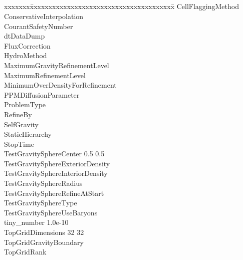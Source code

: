 \documentclass{book}
\begin{document}
\subsection{\enzo}

{\parametersize
\begin{tabbing}
xxxxxxx\=xxxxxxxxxxxxxxxxxxxxxxxxxxxxxxxxxxxxxxx\=\kill
\> CellFlaggingMethod               \\
\> ConservativeInterpolation        \\
\> CourantSafetyNumber          \\
\> dtDataDump              \\
\> FluxCorrection                   \\
\> HydroMethod             \\
\> MaximumGravityRefinementLevel    \\
\> MaximumRefinementLevel               \\
\> MinimumOverDensityForRefinement  \\
\> PPMDiffusionParameter          \\
\> ProblemType                   \\
\> RefineBy                             \\
\> SelfGravity                    \\
\> StaticHierarchy                      \\
\> StopTime                \\
\> TestGravitySphereCenter             0.5 0.5 \\
\> TestGravitySphereExteriorDensity    \\
\> TestGravitySphereInteriorDensity    \\
\> TestGravitySphereRadius             \\
\> TestGravitySphereRefineAtStart      \\
\> TestGravitySphereType               \\
\> TestGravitySphereUseBaryons         \\
\> tiny\_number            \> 1.0e-10  \\
\> TopGridDimensions       32 32 \\
\> TopGridGravityBoundary         \\
\> TopGridRank             
\end{tabbing}}
\end{document}
